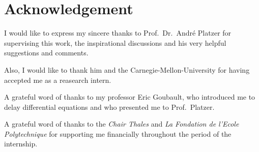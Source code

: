 \chapter*{Acknowledgement}
    I would like to express my sincere thanks to Prof.~Dr.~André Platzer for supervising this work, the inspirational discussions and his very helpful suggestions and comments.

    Also, I would like to thank him and the Carnegie-Mellon-University for having accepted me as a reasearch intern. 

    A grateful word of thanks to my professor Eric Goubault, who introduced me to delay differential equations and who presented me to Prof.~Platzer.

    A grateful word of thanks to the \emph{Chair Thales} and \emph{La Fondation de l'Ecole Polytechnique} for supporting me financially throughout the period of the internship.
